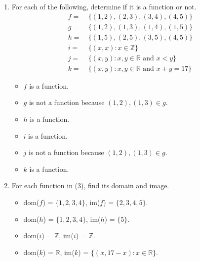 \documentclass{article}
\begin{document}
\begin{enumerate}
	\item For each of the following, determine if it is a function or not.
		\begin{align*}
			f = & \ \{ (1, 2), (2, 3), (3, 4), (4, 5) \} \\
			g = & \ \{ (1, 2), (1, 3), (1, 4), (1, 5) \} \\
			h = & \ \{ (1, 5), (2, 5), (3, 5), (4, 5) \} \\
			i = & \ \{ (x,x) : x \in \mathbb{Z} \} \\
			j = & \ \{ (x,y) : x, y \in \mathbb{R} \text{ and } x < y \} \\
			k = & \ \{ (x,y) : x, y \in \mathbb{R} \text{ and } x + y = 17 \}
		\end{align*}
            \begin{itemize}
                \item $f$ is a function.
                \item $g$ is not a function because $(1, 2), (1, 3) \in g$.
                \item $h$ is a function.
                \item $i$ is a function.
                \item $j$ is not a function because $(1, 2), (1, 3) \in g$.
                \item $k$ is a function.
            \end{itemize}

	\item For each function in (3), find its domain and image.
            \begin{itemize}
                \item dom($f$) = $\{ 1, 2, 3, 4 \}$, im($f$) = $\{ 2, 3, 4, 5 \}$.
                \item dom($h$) = $\{ 1, 2, 3, 4 \}$, im($h$) = $\{ 5 \}$.
                \item dom($i$) = $\mathbb{Z}$, im($i$) = $\mathbb{Z}$.
                \item dom($k$) = $\mathbb{R}$, im($k$) = $\{ (x, 17 - x) : x\in \mathbb{R} \}$.
            \end{itemize}


\end{enumerate}
\end{document}
